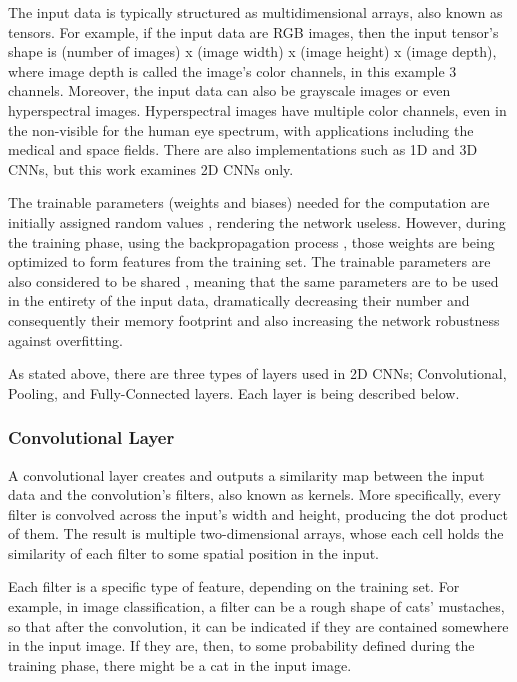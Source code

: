 The input data is typically structured as multidimensional arrays, also known as tensors. For example, if the input data are RGB images, then the input tensor's shape is (number of images) x (image width) x (image height) x (image depth), where image depth is called the image's color channels, in this example 3 channels. Moreover, the input data can also be grayscale images or even hyperspectral images. Hyperspectral images have multiple color channels, even in the non-visible for the human eye spectrum, with applications including the medical and space fields. There are also implementations such as 1D and 3D CNNs, but this work examines 2D CNNs only.

The trainable parameters (weights and biases) needed for the computation are initially assigned random values \cite{Practical-recommendations-for-gradient-based-training-of-deep-architectures}, rendering the network useless. However, during the training phase, using the backpropagation process \cite{Learning-internal-representations-by-error-propagation}, those weights are being optimized to form features from the training set. The trainable parameters are also considered to be shared \cite{Generalization-and-network-design-strategies}, meaning that the same parameters are to be used in the entirety of the input data, dramatically decreasing their number and consequently their memory footprint and also increasing the network robustness against overfitting.

As stated above, there are three types of layers used in 2D CNNs; Convolutional, Pooling, and Fully-Connected layers. Each layer is being described below.

\subsubsection{Convolutional Layer}
A convolutional layer creates and outputs a similarity map between the input data and the convolution's filters, also known as kernels. More specifically, every filter is convolved across the input's width and height, producing the dot product of them. The result is multiple two-dimensional arrays, whose each cell holds the similarity of each filter to some spatial position in the input.

Each filter is a specific type of feature, depending on the training set. For example, in image classification, a filter can be a rough shape of cats' mustaches, so that after the convolution, it can be indicated if they are contained somewhere in the input image. If they are, then, to some probability defined during the training phase, there might be a cat in the input image.

